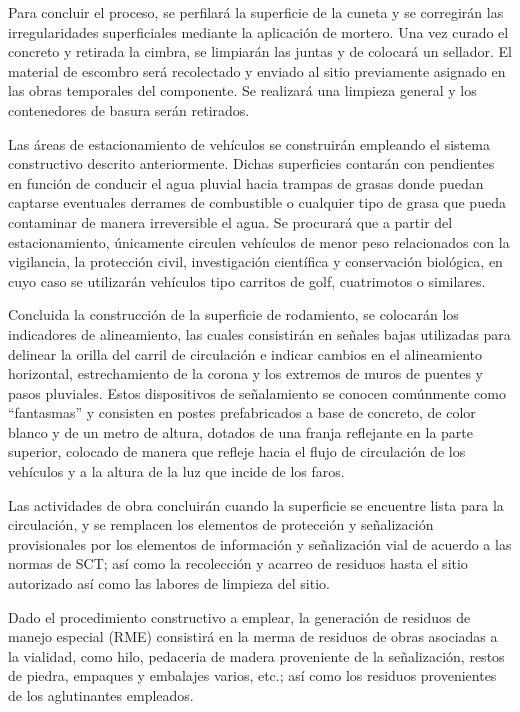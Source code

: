 \documentclass{article}
\begin{document}
\bigskip

Para concluir el proceso, se perfilará la superficie de la cuneta y se corregirán las irregularidades superficiales mediante la aplicación de mortero. Una vez curado el concreto y retirada la cimbra, se limpiarán las juntas y de colocará un sellador. El material de escombro será recolectado y enviado al sitio previamente asignado en las obras temporales del componente. Se realizará una limpieza general y los contenedores de basura serán retirados.

Las áreas de estacionamiento de vehículos se construirán empleando el sistema constructivo descrito anteriormente. Dichas superficies contarán con pendientes en función de conducir el agua pluvial hacia trampas de grasas donde puedan captarse eventuales derrames de combustible o cualquier tipo de grasa que pueda contaminar de manera irreversible el agua. Se procurará que a partir del estacionamiento, únicamente circulen vehículos de menor peso relacionados con la vigilancia, la protección civil, investigación científica y conservación biológica, en cuyo caso se utilizarán vehículos tipo carritos de golf, cuatrimotos o similares.


\bigskip

Concluida la construcción de la superficie de rodamiento, se colocarán los indicadores de alineamiento, las cuales consistirán en señales bajas utilizadas para delinear la orilla del carril de circulación e indicar cambios en el alineamiento horizontal, estrechamiento de la corona y los extremos de muros de puentes y pasos pluviales. Estos dispositivos de señalamiento se conocen comúnmente como “fantasmas” y consisten en postes prefabricados a base de concreto, de color blanco y de un metro de altura, dotados de una franja reflejante en la parte superior, colocado de manera que refleje hacia el flujo de circulación de los vehículos y a la altura de la luz que incide de los faros.


\bigskip

Las actividades de obra concluirán cuando la superficie se encuentre lista para la circulación, y se remplacen los elementos de protección y señalización provisionales por los elementos de información y señalización vial de acuerdo a las normas de SCT; así como la recolección y acarreo de residuos hasta el sitio autorizado así como las labores de limpieza del sitio.


\bigskip

Dado el procedimiento constructivo a emplear, la generación de residuos de manejo especial (RME) consistirá en la merma de residuos de obras asociadas a la vialidad, como hilo, pedaceria de madera proveniente de la señalización, restos de piedra, empaques y embalajes varios, etc.; así como los residuos provenientes de los aglutinantes empleados.
\end{document}
